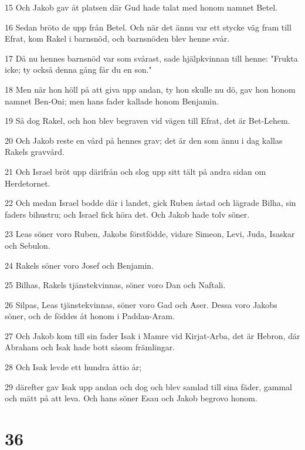 \par 15 Och Jakob gav åt platsen där Gud hade talat med honom namnet Betel.
\par 16 Sedan bröto de upp från Betel. Och när det ännu var ett stycke väg fram till Efrat, kom Rakel i barnsnöd, och barnsnöden blev henne svår.
\par 17 Då nu hennes barnsnöd var som svårast, sade hjälpkvinnan till henne: "Frukta icke; ty också denna gång får du en son."
\par 18 Men när hon höll på att giva upp andan, ty hon skulle nu dö, gav hon honom namnet Ben-Oni; men hans fader kallade honom Benjamin.
\par 19 Så dog Rakel, och hon blev begraven vid vägen till Efrat, det är Bet-Lehem.
\par 20 Och Jakob reste en vård på hennes grav; det är den som ännu i dag kallas Rakels gravvård.
\par 21 Och Israel bröt upp därifrån och slog upp sitt tält på andra sidan om Herdetornet.
\par 22 Och medan Israel bodde där i landet, gick Ruben åstad och lägrade Bilha, sin faders bihustru; och Israel fick höra det. Och Jakob hade tolv söner.
\par 23 Leas söner voro Ruben, Jakobs förstfödde, vidare Simeon, Levi, Juda, Isaskar och Sebulon.
\par 24 Rakels söner voro Josef och Benjamin.
\par 25 Bilhas, Rakels tjänstekvinnas, söner voro Dan och Naftali.
\par 26 Silpas, Leas tjänstekvinnas, söner voro Gad och Aser. Dessa voro Jakobs söner, och de föddes åt honom i Paddan-Aram.
\par 27 Och Jakob kom till sin fader Isak i Mamre vid Kirjat-Arba, det är Hebron, där Abraham och Isak hade bott såsom främlingar.
\par 28 Och Isak levde ett hundra åttio år;
\par 29 därefter gav Isak upp andan och dog och blev samlad till sina fäder, gammal och mätt på att leva. Och hans söner Esau och Jakob begrovo honom.

\chapter{36}

